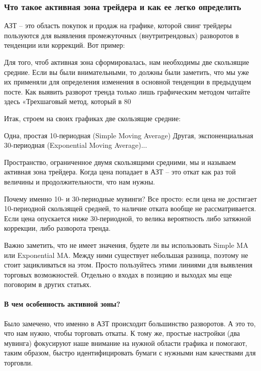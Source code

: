 \documentclass{book}
\begin{document}
\subsubsection{Что такое активная зона трейдера и как ее легко
  определить}

АЗТ – это область покупок и продаж на графике, которой свинг трейдеры пользуются для выявления промежуточных (внутритрендовых) разворотов в тенденции или коррекций. Вот пример:

Для того, чтоб активная зона сформировалась, нам необходимы две скользящие средние. Если вы были внимательными, то должны были заметить, что мы уже их применяли для определения изменения в основной тенденции в предыдущем посте. Как выявить разворот тренда только лишь графическим методом читайте здесь «Трехшаговый метод, который в 80%

Итак, строем на своих графиках две скользящие средние:

    Одна, простая 10-периодная (Simple Moving Average)
    Другая, экспоненциальная 30-периодная (Exponential Moving Average)...

Пространство, ограниченное двумя скользящими средними, мы и называем активная зона трейдера. Когда цена попадает в АЗТ – это откат как раз той величины и продолжительности, что нам нужны.

Почему именно 10- и 30-периодные мувинги? Все просто: если цена не достигает 10-периодной скользящей средней, то наличие отката вообще не рассматривается. Если цена опускается ниже 30-периодной, то велика вероятность либо затяжной коррекции, либо разворота тренда.

Важно заметить, что не имеет значения, будете ли вы использовать
Simple MA или Exponential MA. Между ними существует небольшая разница,
поэтому не стоит зацикливаться на этом. Просто пользуйтесь этими
линиями для выявления торговых возможностей. Отдельно о входах в
позицию и выходах мы еще поговорим в других статьях.

\paragraph{В чем особенность активной зоны?}

Было замечено, что именно в АЗТ происходит большинство разворотов. А это то, что нам нужно, чтобы торговать откаты. К тому же, простые настройки (два мувинга) фокусируют наше внимание на нужной области графика и помогают, таким образом, быстро идентифицировать бумаги с нужными нам качествами для торговли.
\end{document}
